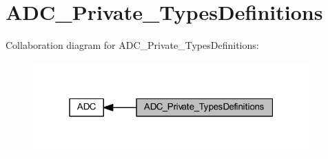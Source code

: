 \hypertarget{group___a_d_c___private___types_definitions}{}\section{A\+D\+C\+\_\+\+Private\+\_\+\+Types\+Definitions}
\label{group___a_d_c___private___types_definitions}
Collaboration diagram for A\+D\+C\+\_\+\+Private\+\_\+\+Types\+Definitions\+:
\nopagebreak
\begin{figure}[H]
\begin{center}
\leavevmode
\includegraphics[width=301pt]{group___a_d_c___private___types_definitions}
\end{center}
\end{figure}
